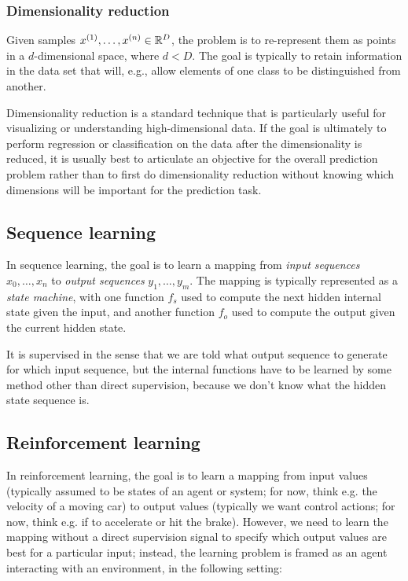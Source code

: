 \subsubsection{Dimensionality reduction}

Given samples $x^{(1)}, \ldots, x^{(n)} \in \mathbb{R}^D$, the problem is to
re-represent them as points in a $d$-dimensional space, where $d <
  D$.  The goal is typically to retain information in the data set that
will, e.g., allow elements of one class to be distinguished from
another.

Dimensionality reduction is a standard technique that is particularly useful for
visualizing or understanding high-dimensional data.  If the goal is
ultimately to perform regression or classification on the data after
the dimensionality is reduced, it is usually best to articulate an objective
for the overall prediction problem rather than to first do
dimensionality reduction without knowing which dimensions will be
important for the prediction task.

\subsection{Sequence learning}

In sequence learning, the goal is to learn a mapping from {\em input
    sequences} $x_0, \ldots, x_n$ to {\em output sequences} $y_1,
  \ldots, y_m$.  The mapping is typically represented as a {\em state
    machine}, with one function $f_s$ used to compute the next hidden
internal state given the input, and another function $f_o$ used to
compute the output given the current hidden state.

It is supervised in the sense that we are told what output sequence to
generate for which input sequence, but the internal functions have to
be learned by some method other than direct supervision, because we
don't know what the hidden state sequence is.


\subsection{Reinforcement learning}

In reinforcement learning, the goal is to learn a mapping from input
values (typically assumed to be states of an agent or system; for now, think e.g. the velocity of a moving car)
to output values (typically we want control actions; for now, think e.g. if to accelerate or hit the brake). However, we need to learn the mapping without a direct supervision
signal to specify which output values are best for a particular
input; instead, the learning problem is framed as an agent interacting with an
environment, in the following setting:

